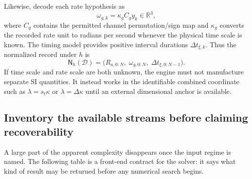\documentclass[11pt]{article}
\begin{document}
    Likewise, decode each rate hypothesis as
    \begin{equation}
        \omega_{g,k}=\kappa_g C_g y_k\in\mathbb R^3,
        \label{eq:canonical-rate}
    \end{equation}
    where $C_g$ contains the permitted channel permutation/sign map and $\kappa_g$ converts
    the recorded rate unit to radians per second whenever the physical time scale is known.
    The timing model provides positive interval durations $\Delta t_{\xi,k}$. Thus the
    normalized record under $h$ is
    \begin{equation}
        \mathsf N_h(\mathcal D)
        =\bigl(R_{a,0:N},\;\omega_{g,0:N},\;\Delta t_{\xi,0:N-1}\bigr).
        \label{eq:normalized-record}
    \end{equation}
    If time scale and rate scale are both unknown, the engine must not manufacture separate
    SI quantities. It instead works in the identifiable combined coordinate such as
    $\lambda=s_t\kappa$ or $\lambda=\Delta\kappa$ until an external dimensional anchor is
    available.

    \subsection{Inventory the available streams before claiming recoverability}

    A large part of the apparent complexity disappears once the input regime is named. The
    following table is a front-end contract for the solver: it says what kind of result may
    be returned before any numerical search begins.
\end{document}
